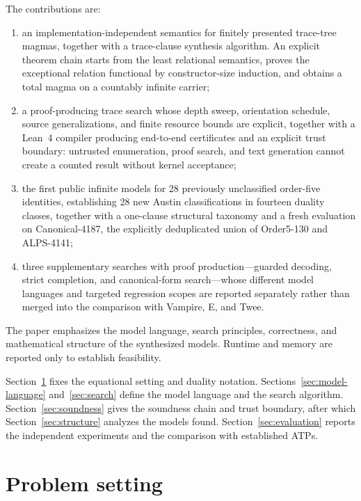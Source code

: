 \documentclass[runningheads]{llncs}
\begin{document}
The contributions are:
\begin{enumerate}
  \item an implementation-independent semantics for finitely presented
    trace-tree magmas, together with a trace-clause synthesis algorithm.  An
    explicit theorem chain starts from the least relational semantics, proves
    the exceptional relation functional by constructor-size induction, and
    obtains a total magma on a countably infinite carrier;
  \item a proof-producing trace search whose depth sweep, orientation schedule,
    source generalizations, and finite resource bounds are explicit, together
    with a Lean~4 compiler producing end-to-end certificates and an explicit
    trust boundary: untrusted enumeration, proof search, and text generation
    cannot create a counted result without kernel acceptance;
  \item the first public infinite models for 28 previously unclassified
    order-five identities, establishing 28 new Austin classifications in
    fourteen duality classes, together with a one-clause structural taxonomy
    and a fresh evaluation on Canonical-4187, the explicitly deduplicated union
    of Order5-130 and ALPS-4141;
  \item three supplementary searches with proof production---guarded decoding,
    strict completion, and canonical-form search---whose different model
    languages and targeted regression scopes are reported separately rather
    than merged into the comparison with Vampire, E, and Twee.
\end{enumerate}

The paper emphasizes the model language, search principles, correctness, and
mathematical structure of the synthesized models.  Runtime and memory are
reported only to establish feasibility.

Section~\ref{sec:problem} fixes the equational setting and duality notation.
Sections~\ref{sec:model-language} and~\ref{sec:search} define the model language
and the search algorithm.  Section~\ref{sec:soundness} gives the soundness
chain and trust boundary, after which Section~\ref{sec:structure} analyzes the
models found.  Section~\ref{sec:evaluation} reports the independent experiments
and the comparison with established ATPs.

\section{Problem setting}
\label{sec:problem}
\end{document}
